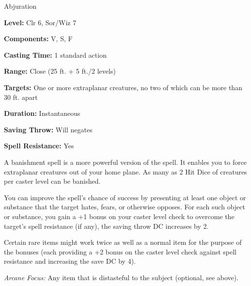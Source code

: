 
Abjuration

\textbf{Level:} Clr 6, Sor/Wiz 7

\textbf{Components:} V, S, F

\textbf{Casting Time:} 1 standard action

\textbf{Range:} Close (25 ft. + 5 ft./2 levels)

\textbf{Targets:} One or more extraplanar creatures, no two of which can be more than 30 ft. apart

\textbf{Duration:} Instantaneous

\textbf{Saving Throw:} Will negates

\textbf{Spell Resistance:} Yes

A banishment spell is a more powerful version of the 
spell. It enables you to force extraplanar creatures out of your home plane. As 
many as 2 Hit Dice of creatures per caster level can be banished.

You can improve the spell's chance of success by presenting at least one object 
or substance that the target hates, fears, or otherwise opposes. For each such 
object or substance, you gain a +1 bonus on your caster level check to overcome 
the target's spell resistance (if any), the saving throw DC increases by 2. 

Certain rare items might work twice as well as a normal item for the purpose of 
the bonuses (each providing a +2 bonus on the caster level check against spell 
resistance and increasing the save DC by 4).

\textit{Arcane Focus:} Any item that is distasteful to the subject (optional, see above).

